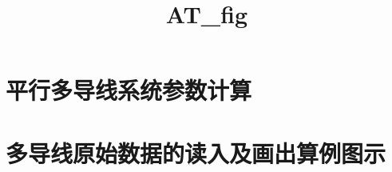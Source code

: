 \documentclass[11pt]{article}
\title{AT\_fig}
\begin{document}
    
    
    \maketitle
    
    

    
    \section{平行多导线系统参数计算}\label{ux5e73ux884cux591aux5bfcux7ebfux7cfbux7edfux53c2ux6570ux8ba1ux7b97}

    \section{多导线原始数据的读入及画出算例图示}\label{ux591aux5bfcux7ebfux539fux59cbux6570ux636eux7684ux8bfbux5165ux53caux753bux51faux7b97ux4f8bux56feux793a}
\end{document}
